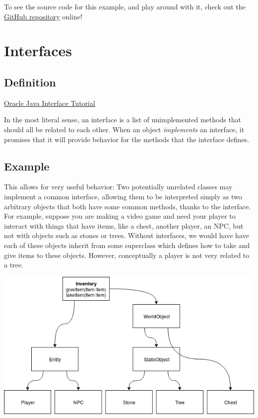 \documentclass{article}
\begin{document}
            To see the source code for this example, and play around with it, check out the \href{https://github.com/andrewlalis/CommandPatternTutorial}{GitHub repository} online!

    \newpage

    \section{Interfaces}
    	\subsection{Definition}
    		\href{https://docs.oracle.com/javase/tutorial/java/concepts/interface.html}{Oracle Java Interface Tutorial}

    		In the most literal sense, an interface is a list of unimplemented methods that should all be related to each other. When an object \textit{implements} an interface, it promises that it will provide behavior for the methods that the interface defines.

    	\subsection{Example}
    		This allows for very useful behavior: Two potentially unrelated classes may implement a common interface, allowing them to be interpreted simply as two arbitrary objects that both have some common methods, thanks to the interface. For example, suppose you are making a video game and need your player to interact with things that have items, like a chest, another player, an NPC, but not with objects such as stones or trees. Without interfaces, we would have have each of these objects inherit from some superclass which defines how to take and give items to these objects. However, conceptually a player is not very related to a tree.

    		\includegraphics[width=\textwidth]{images/interfaces/classesWithSuperclass.png}
\end{document}
